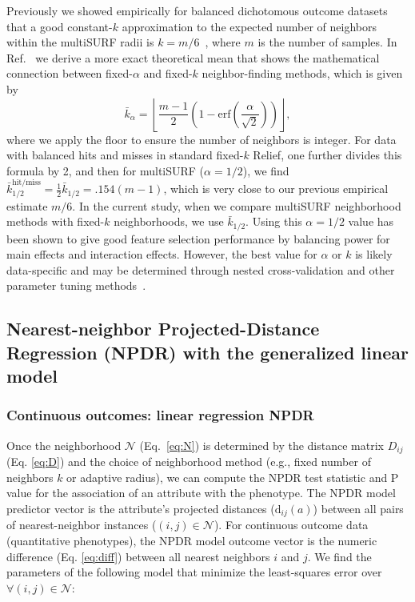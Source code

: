 \documentclass[10pt]{article}
\begin{document}
Previously we showed empirically for balanced dichotomous outcome datasets that a good constant-$k$ approximation to the expected number of neighbors within the multiSURF radii is $k=m/6$~\cite{stir}, where $m$ is the number of samples. In Ref.~\cite{bod} we derive a more exact theoretical mean that shows the mathematical connection between fixed-$\alpha$ and fixed-$k$ neighbor-finding methods, which is given by 
\begin{equation}\label{eq:kbar}
{\bar{k}}_{\alpha} = \left \lfloor \frac{m-1}{2}  \left( 1 - \mathrm{erf}\left( \frac{\alpha}{\sqrt{2}} \right) \right) \right \rfloor,
\end{equation}
where we apply the floor to ensure the number of neighbors is integer. For data with balanced hits and misses in standard fixed-$k$ Relief, one further divides this formula by 2, and then for multiSURF ($\alpha=1/2$), we find $\bar{k}_{1/2}^{\text{hit/miss}} = \frac{1}{2}\bar{k}_{1/2} = .154 (m-1)$, which is very close to our previous empirical estimate $m/6$. In the current study, when we compare multiSURF neighborhood methods with fixed-$k$ neighborhoods, we use $\bar{k}_{1/2}$. Using this $\alpha=1/2$ value has been shown to give good feature selection performance by balancing power for main effects and interaction effects. However, the best value for $\alpha$ or $k$ is likely data-specific and may be determined through nested cross-validation and other parameter tuning methods~\cite{bod}. 

\subsection{Nearest-neighbor Projected-Distance Regression (NPDR) with the generalized linear model}

\subsubsection{Continuous outcomes: linear regression NPDR}\label{sec:regress}

Once the neighborhood $\mathcal{N}$ (Eq.~\ref{eq:N}) is determined by the distance matrix $D_{ij}$ (Eq. \ref{eq:D}) and the choice of neighborhood method (e.g., fixed number of neighbors $k$ or adaptive radius), we can compute the NPDR test statistic and P value for the association of an attribute with the phenotype. The NPDR model predictor vector is the attribute's projected distances ($\text{d}_{ij}(a)$) between all pairs of nearest-neighbor instances ($(i,j) \in \mathcal{N}$). For continuous outcome data (quantitative phenotypes), the NPDR model outcome vector is the numeric difference (Eq. \ref{eq:diff}) between all nearest neighbors $i$ and $j$. We find the parameters of the following model that minimize the least-squares error over $\forall(i,j) \in \mathcal{N}$: 
\end{document}

